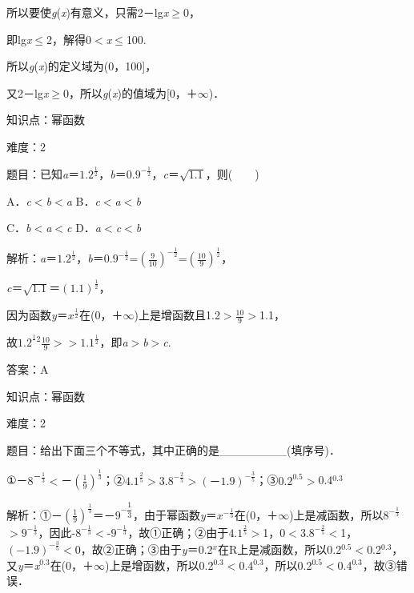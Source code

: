 \documentclass{article} %
\begin{document}
所以要使\textit{g}(\textit{x})有意义，只需2－lg\textit{x}$\mathrm{\ge}$0，

即lg\textit{x}$\mathrm{\le}$2，解得0$\mathrm{<}$\textit{x}$\mathrm{\le}$100.

所以\textit{g}(\textit{x})的定义域为(0，100]，

又2－lg\textit{x}$\mathrm{\ge}$0，所以\textit{g}(\textit{x})的值域为[0，＋$\mathrm{\infty}$)．

知识点：幂函数

难度：2

题目：已知\textit{a}＝$1.2^{\frac{1}{2}}$，\textit{b}＝$0.9^{-\frac{1}{2}}$，\textit{c}＝$\sqrt{1.1}$，则(　　)

A．\textit{c}$\mathrm{<}$\textit{b}$\mathrm{<}$\textit{a}   B．\textit{c}$\mathrm{<}$\textit{a}$\mathrm{<}$\textit{b}

C．\textit{b}$\mathrm{<}$\textit{a}$\mathrm{<}$\textit{c}   D．\textit{a}$\mathrm{<}$\textit{c}$\mathrm{<}$\textit{b}

解析：\textit{a}＝$1.2^{\frac{1}{2}}$，\textit{b}＝$0.9^{-\frac{1}{2}}$=$(\frac{9}{10})^{-\frac{1}{2}}$=$(\frac{10}{9})^{\frac{1}{2}}$，

\textit{c}＝$\sqrt{1.1}$＝$(1.1)^{\frac{1}{2}}$，

因为函数\textit{y}＝$x^{\frac{1}{2}}$在(0，＋$\mathrm{\infty}$)上是增函数且1.2$\mathrm{>}$$\frac{10}{9}$$\mathrm{>}$1.1，

故$1.2^{\frac{1}{}2}$$\frac{10}{9}$$\mathrm{>}$$\mathrm{>}$$1.1^{\frac{1}{2}}$，即\textit{a}$\mathrm{>}$\textit{b}$\mathrm{>}$\textit{c}.

答案：A

知识点：幂函数

难度：2

题目：给出下面三个不等式，其中正确的是\_\_\_\_\_\_\_\_(填序号)．

①－$8^{－\frac{1}{3}}$$\mathrm{<}$－$(\frac{1}{9})^{\frac{1}{3}}$；②$4.1^{\frac{2}{5}}$$\mathrm{>}$$3.8^{-\frac{2}{5}}$$\mathrm{>}$$(－1.9)^{-\frac{3}{5}}$；③$0.2^{0.5}$$\mathrm{>}$0.4${}^{0.3}$

解析：①－$(\frac{1}{9})^{\frac{1}{3}}$＝－$9^{-\dfrac{1}{3}}$，由于幂函数\textit{y}＝$x^{-\frac{1}{3}}$在(0，＋$\mathrm{\infty}$)上是减函数，所以$8^{-\frac{1}{3}}$$\mathrm{>}$$9^{-\frac{1}{3}}$，因此-$8^{-\frac{1}{3}}$$\mathrm{<}$-$9^{-\frac{1}{3}}$，故①正确；②由于$4.1^{\frac{2}{5}}$$\mathrm{>}$1，0$\mathrm{<}$$3.8^{-\frac{2}{5}}$$\mathrm{<}$1，$(-1.9)^{-\frac{3}{5}}$$\mathrm{<}$0，故②正确；③由于\textit{y}＝0.2\textit{${}^{x}$}在R上是减函数，所以0.2${}^{0.5}$$\mathrm{<}$0.2${}^{0.3}$，又\textit{y}＝\textit{x}${}^{0.3}$在(0，＋$\mathrm{\infty}$)上是增函数，所以0.2${}^{0.3}$$\mathrm{<}$0.4${}^{0.3}$，所以0.2${}^{0.5}$$\mathrm{<}$0.4${}^{0.3}$，故③错误．
\end{document}
